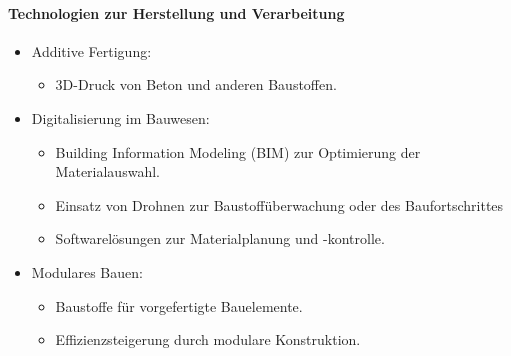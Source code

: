 \documentclass[
11pt,
captions=tableheading,
smallheadings,
headsepline,
footsepline, 
parskip=half-,
]{scrartcl}
\begin{document}
\paragraph{Technologien zur Herstellung und Verarbeitung}
\begin{itemize}
    \item Additive Fertigung:
          \begin{itemize}
              \item 3D-Druck von Beton und anderen Baustoffen.
          \end{itemize}
    \item Digitalisierung im Bauwesen:
          \begin{itemize}
              \item Building Information Modeling (BIM) zur Optimierung der Materialauswahl.
              \item Einsatz von Drohnen zur Baustoffüberwachung oder des Baufortschrittes
              \item Softwarelösungen zur Materialplanung und -kontrolle.
          \end{itemize}
    \item Modulares Bauen:
          \begin{itemize}
              \item Baustoffe für vorgefertigte Bauelemente.
              \item Effizienzsteigerung durch modulare Konstruktion.
          \end{itemize}
\end{itemize}
\end{document}
